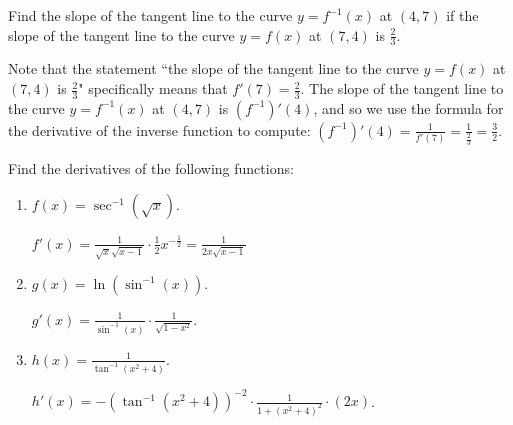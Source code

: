 \documentclass[nooutcomes]{ximera}
\begin{document}
\begin{problem}

  Find the slope of the tangent line to the curve $y = f^{-1}(x)$ at $(4,7)$ if the slope of the tangent line to the curve $y=f(x)$ at $(7,4)$ is $\frac{2}{3}$.
  \begin{freeResponse}
    Note that the statement ``the slope of the tangent line to the curve $y=f(x)$ at $(7,4)$ is $\frac{2}{3}$" specifically means that $f'(7) = \frac{2}{3}$.
    The slope of the tangent line to the curve $y = f^{-1}(x)$ at $(4,7)$ is $(f^{-1})'(4)$, and so we use the formula for the derivative of the inverse function to compute: $(f^{-1})'(4) = \frac{1}{f'(7)} = \frac{1}{\frac{2}{3}} = \frac{3}{2}$.
  \end{freeResponse}
\end{problem}

\begin{problem}
Find the derivatives of the following functions:
	\begin{enumerate}
	
	\item  $f(x) = \sec^{-1} (\sqrt{x})$.
		\begin{freeResponse}
		$f'(x) = \frac{1}{\sqrt{x} \sqrt{x - 1}} \cdot \frac{1}{2} x^{-\frac{1}{2}} = \frac{1}{2x\sqrt{x-1}}$
		\end{freeResponse}
		
		
		
	\item  $g(x) = \ln (\sin^{-1}(x))$.
		\begin{freeResponse}
		$g'(x) = \frac{1}{\sin^{-1}(x)} \cdot \frac{1}{\sqrt{1-x^2}}$.
		\end{freeResponse}
		
		
		
	\item  $h(x) = \frac{1}{\tan^{-1}(x^2 + 4)}$.  
		\begin{freeResponse}
		$h'(x) = - \left( \tan^{-1}(x^2 + 4) \right)^{-2} \cdot \frac{1}{1 + (x^2 + 4)^2} \cdot (2x)$.
		\end{freeResponse}
		
		
		
	\end{enumerate}
		
		
\end{problem}
\end{document}
